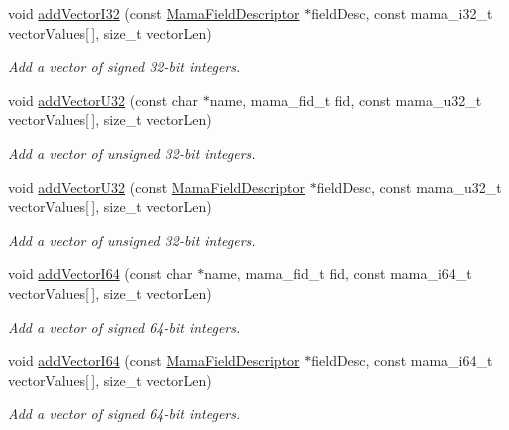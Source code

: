 \begin{DoxyCompactItemize}
void \hyperlink{classWombat_1_1MamaMsg_a2d8be78e6c78a3a68d6f5d8dbcaedc6c}{addVectorI32} (const \hyperlink{classWombat_1_1MamaFieldDescriptor}{MamaFieldDescriptor} $\ast$fieldDesc, const mama\_\-i32\_\-t vectorValues\mbox{[}$\,$\mbox{]}, size\_\-t vectorLen)
\begin{DoxyCompactList}\small\item\em Add a vector of signed 32-\/bit integers. \item\end{DoxyCompactList}\item 
void \hyperlink{classWombat_1_1MamaMsg_a2beef7bf6074edca0b63be8477dce361}{addVectorU32} (const char $\ast$name, mama\_\-fid\_\-t fid, const mama\_\-u32\_\-t vectorValues\mbox{[}$\,$\mbox{]}, size\_\-t vectorLen)
\begin{DoxyCompactList}\small\item\em Add a vector of unsigned 32-\/bit integers. \item\end{DoxyCompactList}\item 
void \hyperlink{classWombat_1_1MamaMsg_a62c496a76fcfa4a772fa1770115570cd}{addVectorU32} (const \hyperlink{classWombat_1_1MamaFieldDescriptor}{MamaFieldDescriptor} $\ast$fieldDesc, const mama\_\-u32\_\-t vectorValues\mbox{[}$\,$\mbox{]}, size\_\-t vectorLen)
\begin{DoxyCompactList}\small\item\em Add a vector of unsigned 32-\/bit integers. \item\end{DoxyCompactList}\item 
void \hyperlink{classWombat_1_1MamaMsg_a9fa5ce7b02c3d72c301a56c20500de17}{addVectorI64} (const char $\ast$name, mama\_\-fid\_\-t fid, const mama\_\-i64\_\-t vectorValues\mbox{[}$\,$\mbox{]}, size\_\-t vectorLen)
\begin{DoxyCompactList}\small\item\em Add a vector of signed 64-\/bit integers. \item\end{DoxyCompactList}\item 
void \hyperlink{classWombat_1_1MamaMsg_af4be377518eb0c27bb3ca3cb73fb32ac}{addVectorI64} (const \hyperlink{classWombat_1_1MamaFieldDescriptor}{MamaFieldDescriptor} $\ast$fieldDesc, const mama\_\-i64\_\-t vectorValues\mbox{[}$\,$\mbox{]}, size\_\-t vectorLen)
\begin{DoxyCompactList}\small\item\em Add a vector of signed 64-\/bit integers. \item\end{DoxyCompactList}\item 

\end{DoxyCompactItemize}
